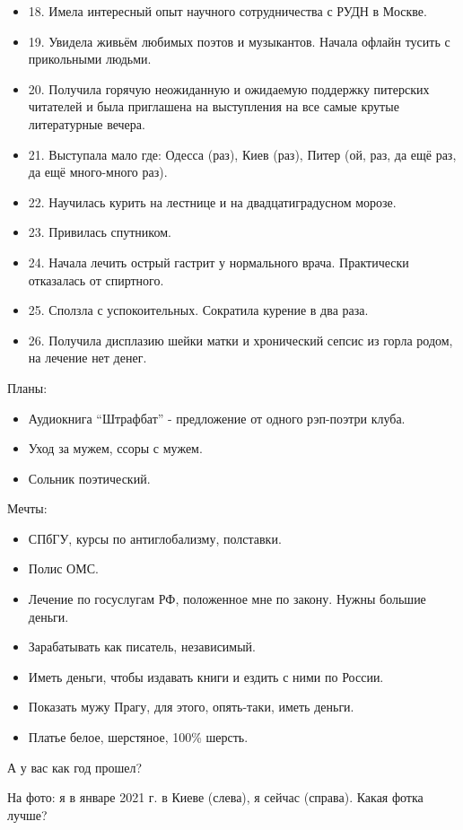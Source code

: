 \begin{itemize}
  \item 18. Имела интересный опыт научного сотрудничества с РУДН в Москве.
  \item 19. Увидела живьём любимых поэтов и музыкантов. Начала офлайн тусить с прикольными людьми.
  \item 20. Получила горячую неожиданную и ожидаемую поддержку питерских читателей и была приглашена на выступления на все самые крутые литературные вечера.
  \item 21. Выступала мало где: Одесса (раз), Киев (раз), Питер (ой, раз, да ещё раз, да ещё много-много раз).
  \item 22. Научилась курить на лестнице и на двадцатиградусном морозе.
  \item 23.  Привилась спутником.
  \item 24. Начала лечить острый гастрит у нормального врача. Практически отказалась от спиртного.
  \item 25. Сползла с успокоительных. Сократила курение в два раза.
  \item 26. Получила дисплазию шейки матки и хронический сепсис из горла родом, на лечение нет денег.
\end{itemize}

Планы:

\begin{itemize}
  \item Аудиокнига \enquote{Штрафбат} - предложение от одного рэп-поэтри клуба.
  \item Уход за мужем, ссоры с мужем.
  \item Сольник поэтический.
\end{itemize}

Мечты:

\begin{itemize}
  \item СПбГУ, курсы по антиглобализму, полставки.
  \item Полис ОМС. 
  \item Лечение по госуслугам РФ, положенное мне по закону. Нужны большие деньги.
  \item Зарабатывать как писатель, независимый.
  \item Иметь деньги, чтобы издавать книги и ездить с ними по России.
  \item Показать мужу Прагу, для этого, опять-таки, иметь деньги.
  \item Платье белое, шерстяное, 100\% шерсть.
\end{itemize}

А у вас как год прошел?

На фото: я в январе 2021 г. в Киеве (слева), я сейчас (справа). Какая фотка
лучше?

